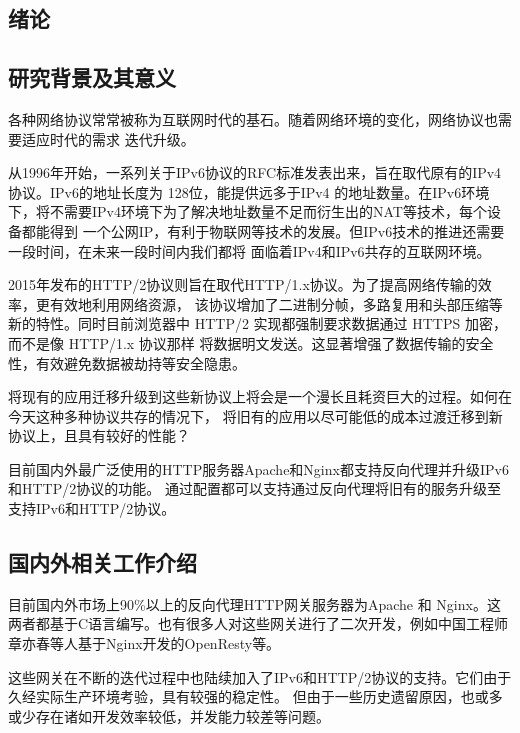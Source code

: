 \documentclass[twoside]{CUGThesis}
\begin{document}
	
	\makeToc
	
	
	\begin{spacing}{2}
		\section{绪论}
	\end{spacing}
	\subsection{研究背景及其意义}
	各种网络协议常常被称为互联网时代的基石。随着网络环境的变化，网络协议也需要适应时代的需求
	迭代升级。\par
	从1996年开始，一系列关于IPv6协议的RFC标准发表出来，旨在取代原有的IPv4协议。IPv6的地址长度为
	128位，能提供远多于IPv4 的地址数量。在IPv6环境下，将不需要IPv4环境下为了解决地址数量不足而衍生出的NAT等技术，每个设备都能得到
	一个公网IP，有利于物联网等技术的发展。但IPv6技术的推进还需要一段时间，在未来一段时间内我们都将
	面临着IPv4和IPv6共存的互联网环境。\par
		2015年发布的HTTP/2协议则旨在取代HTTP/1.x协议。为了提高网络传输的效率，更有效地利用网络资源，
	该协议增加了二进制分帧，多路复用和头部压缩等新的特性。同时目前浏览器中 HTTP/2 
	实现都强制要求数据通过 HTTPS 加密，而不是像 HTTP/1.x 协议那样
	将数据明文发送。这显著增强了数据传输的安全性，有效避免数据被劫持等安全隐患。\par
	将现有的应用迁移升级到这些新协议上将会是一个漫长且耗资巨大的过程。如何在今天这种多种协议共存的情况下，
	将旧有的应用以尽可能低的成本过渡迁移到新协议上，且具有较好的性能？\par
		目前国内外最广泛使用的HTTP服务器Apache和Nginx都支持反向代理并升级IPv6和HTTP/2协议的功能。
		通过配置都可以支持通过反向代理将旧有的服务升级至支持IPv6和HTTP/2协议。

	\subsection{国内外相关工作介绍}
	目前国内外市场上90\%以上的反向代理HTTP网关服务器为Apache 和 Nginx。这两者都基于C语言编写。也有很多人对这些网关进行了二次开发，例如中国工程师章亦春等人基于Nginx开发的OpenResty\cite{OpenResty}等。\par
	这些网关在不断的迭代过程中也陆续加入了IPv6和HTTP/2协议的支持。它们由于久经实际生产环境考验，具有较强的稳定性。
	但由于一些历史遗留原因，也或多或少存在诸如开发效率较低，并发能力较差等问题。
\end{document}
